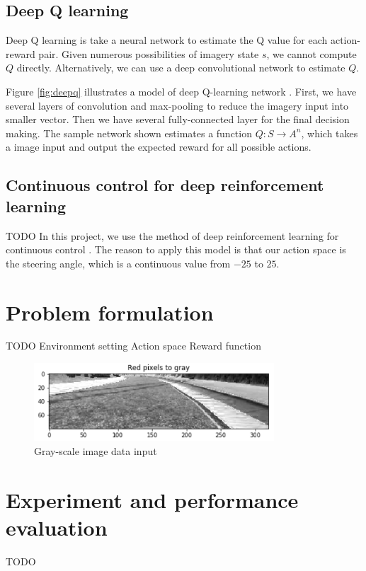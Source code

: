 \documentclass[a4paper]{article}
\begin{document}
\subsection{Deep Q learning}
 Deep Q learning is take a neural network to estimate the Q value for each action-reward pair. Given
numerous possibilities of imagery state $s$, we cannot compute $Q$ directly. Alternatively, we
can use a deep convolutional network to estimate $Q$.

Figure \ref{fig:deepq} illustrates a model of deep Q-learning network \cite{dqn}. First, we have
several layers of convolution and max-pooling to reduce the imagery input into smaller vector.
Then we have several fully-connected layer for the final decision making. The sample network
shown estimates a function $Q : S \rightarrow A^n$, which takes a image input and output the
expected reward for all possible actions.

\subsection{Continuous control for deep reinforcement learning}
TODO
In this project, we use the method of deep reinforcement learning for continuous control \cite{continous}.
The reason to apply this model is that our action space is the steering angle, which is a continuous 
value from $-25$ to $25$.

\section{Problem formulation}
TODO
Environment setting
Action space
Reward function

\begin{figure}
    \centering
    \includegraphics[width=0.8\textwidth]{./figures/sample_gray.jpg}
    \caption{ Gray-scale image data input }
    \label{fig:sample_gray}
\end{figure}


\section{Experiment and performance evaluation}
TODO
\end{document}
